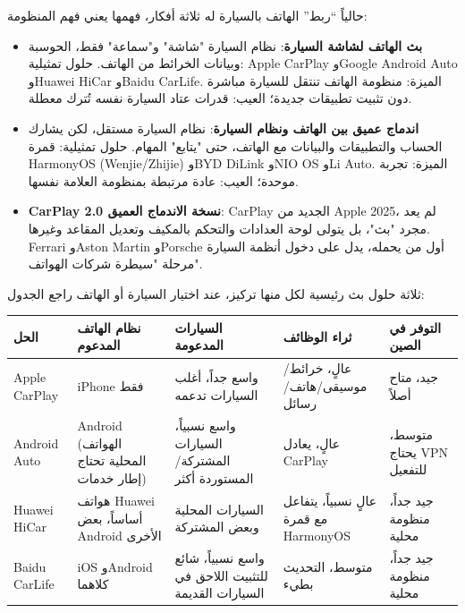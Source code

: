 


حالياً “ربط” الهاتف بالسيارة له ثلاثة أفكار، فهمها يعني فهم المنظومة:

\begin{itemize}
  \item \textbf{بث الهاتف لشاشة السيارة}: نظام السيارة "شاشة" و"سماعة" فقط، الحوسبة وبيانات الخرائط من الهاتف. حلول تمثيلية: Apple CarPlay وGoogle Android Auto وHuawei HiCar وBaidu CarLife. الميزة: منظومة الهاتف تنتقل للسيارة مباشرة دون تثبيت تطبيقات جديدة؛ العيب: قدرات عتاد السيارة نفسه تُترك معطلة.
  \item \textbf{اندماج عميق بين الهاتف ونظام السيارة}: نظام السيارة مستقل، لكن يشارك الحساب والتطبيقات والبيانات مع الهاتف، حتى "يتابع" المهام. حلول تمثيلية: قمرة HarmonyOS (Wenjie/Zhijie) وBYD DiLink وNIO OS وLi Auto. الميزة: تجربة موحدة؛ العيب: عادة مرتبطة بمنظومة العلامة نفسها.
  \item \textbf{CarPlay 2.0 نسخة الاندماج العميق}: CarPlay الجديد من Apple 2025، لم يعد مجرد "بث"، بل يتولى لوحة العدادات والتحكم بالمكيف وتعديل المقاعد وغيرها. Ferrari وAston Martin وPorsche أول من يحمله، يدل على دخول أنظمة السيارة مرحلة "سيطرة شركات الهواتف".
\end{itemize}


ثلاثة حلول بث رئيسية لكل منها تركيز، عند اختيار السيارة أو الهاتف راجع الجدول:

\begin{center}
\begin{tabularx}{\linewidth}{|X|X|X|X|X|}
\hline
\textbf{الحل} & \textbf{نظام الهاتف المدعوم} & \textbf{السيارات المدعومة} & \textbf{ثراء الوظائف} & \textbf{التوفر في الصين} \tabularnewline
\hline
Apple CarPlay & iPhone فقط & واسع جداً، أغلب السيارات تدعمه & عالٍ، خرائط/موسيقى/هاتف/رسائل & جيد، متاح أصلاً \tabularnewline
Android Auto & Android (الهواتف المحلية تحتاج إطار خدمات) & واسع نسبياً، السيارات المشتركة/المستوردة أكثر & عالٍ، يعادل CarPlay & متوسط، يحتاج VPN للتفعيل \tabularnewline
Huawei HiCar & هواتف Huawei أساساً، بعض Android الأخرى & السيارات المحلية وبعض المشتركة & عالٍ نسبياً، يتفاعل مع قمرة HarmonyOS & جيد جداً، منظومة محلية \tabularnewline
Baidu CarLife & iOS وAndroid كلاهما & واسع نسبياً، شائع للتثبيت اللاحق في السيارات القديمة & متوسط، التحديث بطيء & جيد جداً، منظومة محلية \tabularnewline
\hline
\end{tabularx}
\end{center}

